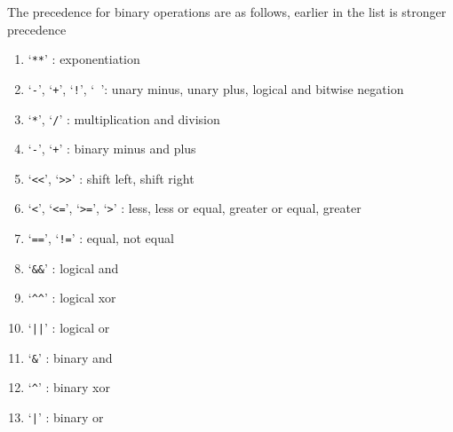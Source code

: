 \documentclass[10pt]{artikel1}
\newcommand{\token}[1]{`\texttt{#1}'}
\begin{document}
The precedence for binary operations are as follows, earlier in the list is stronger precedence \begin{enumerate}
    \item \token{**} : exponentiation
    \item \token{-}, \token{+}, \token{!}, \token{~}: unary minus, unary plus, logical and bitwise negation
    \item \token{*}, \token{/} : multiplication and division
    \item \token{-}, \token{+} : binary minus and plus
    \item \token{<<}, \token{>>} : shift left, shift right
    \item \token{<}, \token{<=}, \token{>=}, \token{>} : less, less or equal, greater or equal, greater
    \item \token{==}, \token{!=} : equal, not equal
    \item `\verb|&&|' : logical and
    \item `\verb|^^|' : logical xor
    \item \token{||} : logical or
    \item `\verb|&|' : binary and
    \item `\verb|^|' : binary xor
    \item \token{|} : binary or
\end{enumerate}
\end{document}
